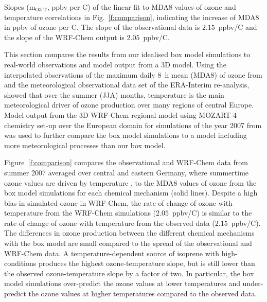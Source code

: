 \begin{table}[t]%
    \centering%
    \caption{Slopes (m$_{\text{O3-T}}$, ppbv per \degree C) of the linear fit to MDA8 values of ozone and temperature correlations in Fig.~\ref{f:comparison}, indicating the increase of MDA8 in ppbv of ozone per \degree C. The slope of the observational data is $2.15$~ppbv/\degree C and the slope of the WRF-Chem output is $2.05$~ppbv/\degree C.}%
    \label{t:mo3-t}%
    \vspace{2mm}
    \vspace{-4mm}
\end{table} 

This section compares the results from our idealised box model simulations to real-world observations and model output from a 3D model.
Using the interpolated observations of the maximum daily 8~h mean (MDA8) of ozone from \citet{Schnell:2015} and the meteorological observational data set of the ERA-Interim re-analysis,
\citet{Otero:2016} showed that over the summer (JJA) months, temperature is the main meteorological driver of ozone production over many regions of central Europe.
Model output from the 3D WRF-Chem regional model using MOZART-4 chemistry set-up over the European domain for simulations of the year 2007 from \citet{Mar:2016} was used to further compare the box model simulations to a model including more meteorological processes than our box model.

Figure~\ref{f:comparison} compares the observational and WRF-Chem data from summer 2007 averaged over central and eastern Germany, where summertime ozone values are driven by temperature \citep{Otero:2016}, to the MDA8 values of ozone from the box model simulations for each chemical mechanism (solid lines).
Despite a high bias in simulated ozone in WRF-Chem, the rate of change of ozone with temperature from the WRF-Chem simulations ($2.05$~ppbv/\degree C) is similar to the rate of change of ozone with temperature from the observed data ($2.15$~ppbv/\degree C).
The differences in ozone production between the different chemical mechanisms with the box model are small compared to the spread of the observational and WRF-Chem data.
A temperature-dependent source of isoprene with high- conditions produces the highest ozone-temperature slope, but is still lower than the observed ozone-temperature slope by a factor of two.
In particular, the box model simulations over-predict the ozone values at lower temperatures and under-predict the ozone values at higher temperatures compared to the observed data.

